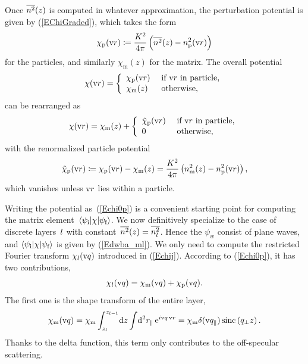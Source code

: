 Once $\overline{n^2}(z)$ is computed in whatever approximation,
the perturbation potential is given by (\ref{EChiGraded}),
which takes the form
\begin{equation}
  \chi_\text{p}(\text{v}{r}) \coloneqq  \frac{K^2}{4\pi}\left(\overline{n^2}(z)-n_\text{p}^2(\text{v}{r})\right)
\end{equation}
for the particles, and similarly $\chi_\text{m}(z)$ for the matrix.
The overall potential
\begin{equation}
  \chi(\text{v}{r})=\left\{\begin{array}{ll}
  \chi_\text{p}(\text{v}{r})&\text{~if $\text{v}{r}$ in particle,}\\[.2ex]
  \chi_\text{m}(z) &\text{~otherwise,} \end{array}\right.
\end{equation}
%
%
can be rearranged as
\begin{equation}\label{Echi0p}
  \chi(\text{v}{r})=\chi_\text{m}(z) + \left\{\begin{array}{ll}
  \tilde\chi_\text{p}(\text{v}{r})&\text{~if $\text{v}{r}$ in particle,}\\[.2ex]
  0 &\text{~otherwise,} \end{array}\right.
\end{equation}
with the renormalized particle potential
\begin{equation}
  \tilde\chi_\text{p}(\text{v}{r})
  \coloneqq  \chi_\text{p}(\text{v}{r})-\chi_\text{m}(z)
  = \frac{K^2}{4\pi}\left(n_\text{m}^2(z)-n_\text{p}^2(\text{v}{r})\right),
\end{equation}
%
which vanishes unless $\text{v}{r}$ lies within a particle.

Writing the potential as~(\ref{Echi0p}) is a convenient starting point
for computing the matrix element~$\left\langle\psi_{\text{i}}|\chi|\psi_{\text{f}}\right\rangle$.
We now definitively specialize to the case of discrete layers~$l$
with constant~$\overline{n^2}(z)=\overline{n_l^2}$.
Hence the $\psi_{w}$ consist of plane waves,
and $\left\langle\psi_{\text{i}}|\chi|\psi_{\text{f}}\right\rangle$ is given by (\ref{Edwba_ml}).
We only need to compute the restricted Fourier transform
$\chi_l(\text{v}{q})$ introduced in (\ref{Echij}).
According to (\ref{Echi0p}),
it has two contributions,
\begin{equation}\label{Echijmp}
  \chi_l(\text{v}{q}) = \chi_\text{m}(\text{v}{q}) + \chi_\text{p}(\text{v}{q}).
\end{equation}
The first one is the shape transform of the entire layer,
\begin{equation}
  \chi_\text{m}(\text{v}{q})
  = \chi_\text{m} \int_{z_l}^{z_{l-1}}\!\text{d} z \int\!\text{d}^2r_\parallel\, \text{e}^{i\text{v}{q}\,\text{v}{r}}
  = \chi_\text{m} \delta(\text{v}{q}_\parallel) \operatorname{sinc}\left( q_\perp z \right).
\end{equation}
Thanks to the delta function,
this term only contributes to the off-specular scattering.

